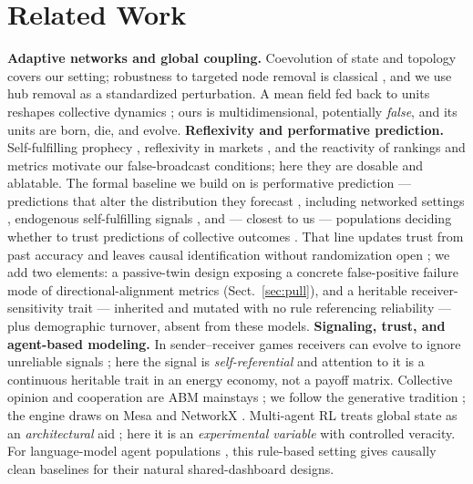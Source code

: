 \documentclass{svproc}
\begin{document}
\section{Related Work}
\textbf{Adaptive networks and global coupling.} Coevolution of state and
topology \cite{gross2008adaptive,holme2012temporal} covers our setting;
robustness to targeted node removal is classical \cite{albert2000error}, and
we use hub removal as a standardized perturbation. A mean field fed back to
units reshapes collective dynamics \cite{kuramoto1984chemical}; ours is
multidimensional, potentially \emph{false}, and its units are born, die, and
evolve.
\textbf{Reflexivity and performative prediction.}
Self-fulfilling prophecy \cite{merton1948self}, reflexivity in markets
\cite{soros2013fallibility}, and the reactivity of rankings and metrics
\cite{espeland2007rankings,strathern1997improving} motivate our
false-broadcast conditions; here they are dosable and ablatable. The formal
baseline we build on is performative prediction --- predictions that alter
the distribution they forecast \cite{perdomo2020performative,hardt2025performative},
including networked settings \cite{wang2023network}, endogenous
self-fulfilling signals \cite{iwase2017self}, and --- closest to us ---
populations deciding whether to trust predictions of collective outcomes
\cite{gois2024performative}. That line updates trust from past accuracy and
leaves causal identification without randomization open
\cite{cheng2024causal}; we add two elements: a passive-twin design
exposing a concrete false-positive failure mode of directional-alignment
metrics (Sect.~\ref{sec:pull}), and a heritable receiver-sensitivity trait
--- inherited and mutated with no rule referencing reliability --- plus
demographic turnover, absent from these models.
\textbf{Signaling, trust, and agent-based modeling.} In sender--receiver
games receivers can evolve to ignore unreliable signals \cite{skyrms2010signals};
here the signal is \emph{self-referential} and attention to it is a
continuous heritable trait in an energy economy, not a payoff matrix.
Collective opinion and cooperation are ABM mainstays
\cite{castellano2009statistical,perc2017statistical}; we follow the
generative tradition \cite{epstein1996growing,bonabeau2002agent}; the
engine draws on Mesa \cite{kazil2020mesa} and NetworkX
\cite{hagberg2008exploring}. Multi-agent RL treats global state as an
\emph{architectural} aid \cite{foerster2016learning}; here it is an
\emph{experimental variable} with controlled veracity. For language-model
agent populations \cite{park2023generative}, this rule-based setting gives
causally clean baselines for their natural shared-dashboard designs.
\end{document}
